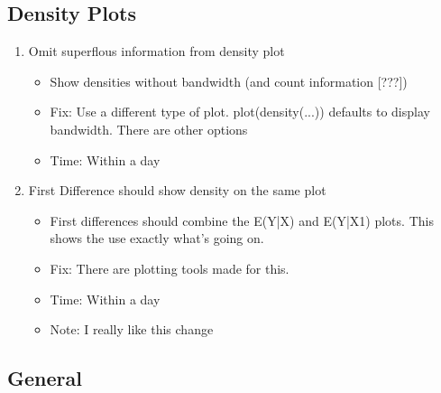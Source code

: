 \documentclass{article}
\begin{document}
\subsection{Density Plots}

\begin{enumerate}
  \item Omit superflous information from density plot \begin{itemize}
      \item Show densities without bandwidth (and count information [???])
      \item Fix: Use a different type of plot. plot(density(...)) defaults to display bandwidth. There are other options
      \item Time: Within a day
    \end{itemize}

  \item First Difference should show density on the same plot \begin{itemize}
      \item First differences should combine the E(Y|X) and E(Y|X1) plots. This shows the use exactly what's going on.
      \item Fix: There are plotting tools made for this.
      \item Time: Within a day
      \item Note: I really like this change
    \end{itemize}
\end{enumerate}

\subsection{General}
\end{document}
